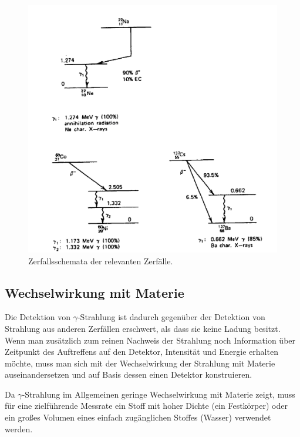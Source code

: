 \documentclass[
	a4paper,
	12pt,
	pagesize,
	ngerman
]{scrartcl}
\begin{document}
	\begin{figure}[H]
			\includegraphics[width= 0.8 \linewidth]{charts/Zerfallsschematarot}
			\caption{
				Zerfallsschemata der relevanten Zerfälle.
				\cite{Anleitung}
			}
			\label{fig_zerfallsschemata}
	\end{figure}

	\subsection{Wechselwirkung mit Materie}

	Die Detektion von $\gamma$-Strahlung ist dadurch gegenüber der Detektion von Strahlung aus anderen Zerfällen erschwert, als dass sie keine Ladung besitzt.
	Wenn man zusätzlich zum reinen Nachweis der Strahlung noch Information über Zeitpunkt des Auftreffens auf den Detektor, Intensität und Energie erhalten möchte, muss man sich mit der Wechselwirkung der Strahlung mit Materie auseinandersetzen und auf Basis dessen einen Detektor konstruieren.

	Da $\gamma$-Strahlung im Allgemeinen geringe Wechselwirkung mit Materie zeigt, muss für eine zielführende Messrate ein Stoff mit hoher Dichte (ein Festkörper) oder ein großes Volumen eines einfach zugänglichen Stoffes (Wasser) verwendet werden. %
\end{document}
